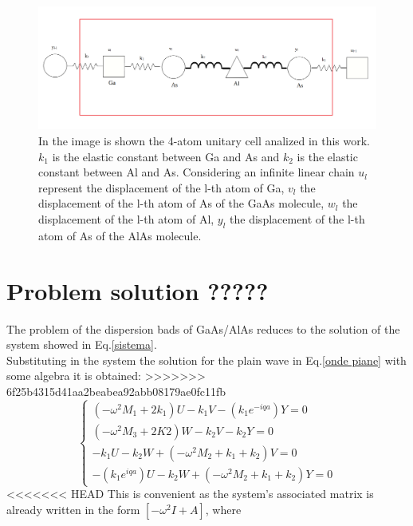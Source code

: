 \documentclass{article}
\begin{document}
\begin{figure}
	\centering
	\includegraphics[width=0.7\linewidth]{cella.png}
	\caption{In the image is shown the 4-atom unitary cell analized in this work.$k_1$ is the elastic constant between Ga and As and $k_2$ is the elastic constant between Al and As. Considering an infinite linear chain $u_l$ represent the displacement of the l-th atom of Ga, $v_l$ the displacement of the l-th atom of As of the GaAs molecule, $w_l$ the displacement of the l-th atom of Al, $y_l$ the displacement of the l-th atom of As of the AlAs molecule.   }
	\label{fig:cella}
\end{figure}


\section{Problem solution ?????}
The problem of the dispersion bads of GaAs/AlAs reduces to the solution of the system showed in Eq.\ref{sistema}. \\
Substituting in the system the solution for the plain wave in Eq.\ref{onde piane} with some algebra it is obtained:
>>>>>>> 6f25b4315d41aa2beabea92abb08179ae0fc11fb
\begin{equation}
	\begin{cases}
	(-\omega^2M_1 + 2k_1)U - k_1V - (k_1e^{-iqa})Y = 0 \\
    (-\omega^2M_3 + 2K2)W -k_2V - k_2Y = 0 \\
	-k_1U -k_2W + (-\omega^2M_2 + k_1 + k_2)V = 0 \\
	-(k_1e^{iqa})U - k_2W + (-\omega^2M_2 + k_1 + k_2)Y = 0	
	\end{cases}
	\label{sist.final}
\end{equation}
<<<<<<< HEAD
This is convenient as the system's associated matrix is already written in the form $[-\omega^2I + A]$, where
\end{document}
